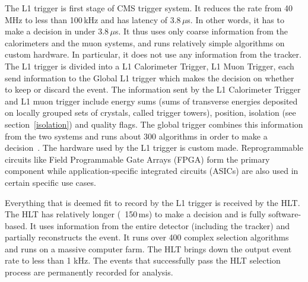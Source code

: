 The L1 trigger is first stage of CMS trigger system. It reduces the rate from 40\,MHz to less than 100\,kHz and has latency of 3.8\,$\mu$s. In other words, it has to make a decision in under 3.8\,$\mu$s. It thus uses only coarse information from the calorimeters and the muon systems, and runs relatively simple algorithms on custom hardware. In particular, it does not use any information from the tracker. The L1 trigger is divided into a L1 Calorimeter Trigger, L1 Muon Trigger, each send information to the Global L1 trigger which makes the decision on whether to keep or discard the event. The information sent by the L1 Calorimeter Trigger and L1 muon trigger include energy sums (sums of transverse energies deposited on locally grouped sets of crystals, called trigger towers), position, isolation (see section~\ref{isolation}) and quality flags. The global trigger combines this information from the two systems and runs about 300 algorithms in order to make a decision~\cite{trigger2}. The hardware used by the L1 trigger is custom made. Reprogrammable circuits like Field Programmable Gate Arrays (FPGA) form the primary component while application-specific integrated circuits (ASICs) are also used in certain specific use cases.  

Everything that is deemed fit to record by the L1 trigger is received by the HLT. The HLT has relatively longer (~150\,ms) to make a decision and is fully software-based. It uses information from the entire detector (including the tracker) and partially reconstructs the event. It runs over 400 complex selection algorithms and runs on a massive computer farm. The HLT brings down the output event rate to less than 1 kHz. The events that successfully pass the HLT selection process are permanently recorded for analysis. 

